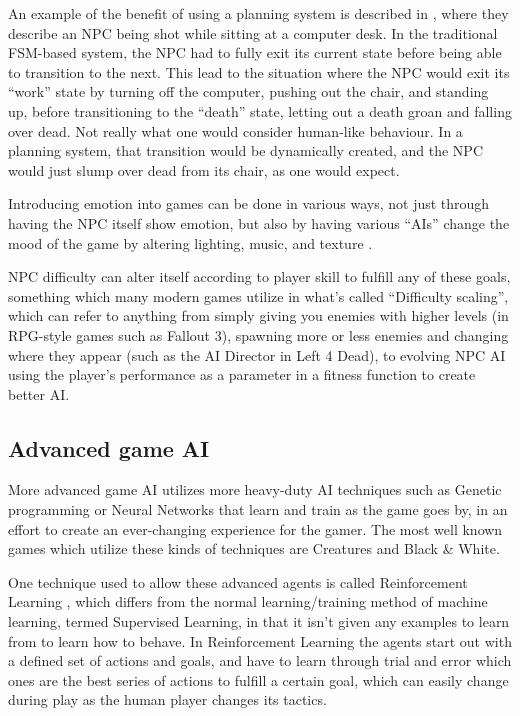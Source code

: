 An example of the benefit of using a planning system is described in
\citet{orkin2006three}, where they describe an NPC being shot while sitting at a
computer desk. In the traditional FSM-based system, the NPC had to fully exit
its current state before being able to transition to the next. This lead to the
situation where the NPC would exit its ``work'' state by turning off the
computer, pushing out the chair, and standing up, before transitioning to the
``death'' state, letting out a death groan and falling over dead. Not really
what one would consider human-like behaviour. In a planning system, that
transition would be dynamically created, and the NPC would just slump over dead
from its chair, as one would expect.

Introducing emotion into games can be done in various ways, not just through
having the NPC itself show emotion, but also by having various ``AIs'' change
the mood of the game by altering lighting, music, and texture
\citep[chap.~9]{kirby2011introduction}.

NPC difficulty can alter itself according to player skill to fulfill any of
these goals, something which many modern games utilize in what's called
``Difficulty scaling'', which can refer to anything from simply giving you
enemies with higher levels (in RPG-style games such as Fallout 3), spawning more
or less enemies and changing where they appear (such as the AI Director in Left
4 Dead), to evolving NPC AI using the player's performance as a parameter in a
fitness function to create better AI. 

\subsection{Advanced game AI}
\label{sec:advanced-game-ai}

More advanced game AI utilizes more heavy-duty AI techniques such as Genetic
programming or Neural Networks that learn and train as the game goes by, in an
effort to create an ever-changing experience for the gamer. The most well known
games which utilize these kinds of techniques are Creatures
\citep{grand1997creatures} and Black \& White.

One technique used to allow these advanced agents is called Reinforcement
Learning \citep{merrick2006motivated,sutton1998reinforcement}, which differs
from the normal learning/training method of machine learning, termed Supervised
Learning, in that it isn't given any examples to learn from to learn how to
behave. In Reinforcement Learning the agents start out with a defined set of
actions and goals, and have to learn through trial and error which ones are the
best series of actions to fulfill a certain goal, which can easily change during
play as the human player changes its tactics.

